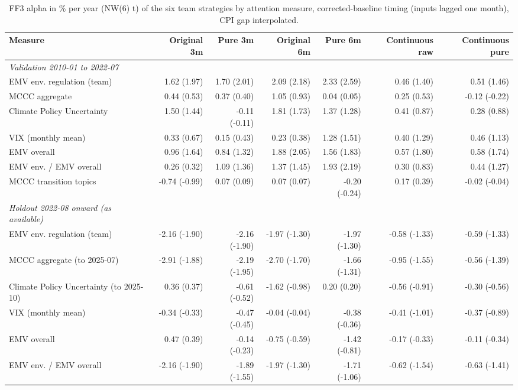 \begin{table}[htbp]
\centering
\footnotesize
\caption{FF3 alpha in \% per year (NW(6) t) of the six team strategies by attention measure, corrected-baseline timing (inputs lagged one month), CPI gap interpolated.}
\label{tab:m1b_alpha_grid_realtime}
\begin{tabular}{lrrrrrr}
\toprule
Measure & Original 3m & Pure 3m & Original 6m & Pure 6m & Continuous raw & Continuous pure \\
\midrule
\textit{Validation 2010-01 to 2022-07} &  &  &  &  &  &  \\
EMV env. regulation (team) & 1.62 (1.97) & 1.70 (2.01) & 2.09 (2.18) & 2.33 (2.59) & 0.46 (1.40) & 0.51 (1.46) \\
MCCC aggregate & 0.44 (0.53) & 0.37 (0.40) & 1.05 (0.93) & 0.04 (0.05) & 0.25 (0.53) & -0.12 (-0.22) \\
Climate Policy Uncertainty & 1.50 (1.44) & -0.11 (-0.11) & 1.81 (1.73) & 1.37 (1.28) & 0.41 (0.87) & 0.28 (0.88) \\
VIX (monthly mean) & 0.33 (0.67) & 0.15 (0.43) & 0.23 (0.38) & 1.28 (1.51) & 0.40 (1.29) & 0.46 (1.13) \\
EMV overall & 0.96 (1.64) & 0.84 (1.32) & 1.88 (2.05) & 1.56 (1.83) & 0.57 (1.80) & 0.58 (1.74) \\
EMV env. / EMV overall & 0.26 (0.32) & 1.09 (1.36) & 1.37 (1.45) & 1.93 (2.19) & 0.30 (0.83) & 0.44 (1.27) \\
MCCC transition topics & -0.74 (-0.99) & 0.07 (0.09) & 0.07 (0.07) & -0.20 (-0.24) & 0.17 (0.39) & -0.02 (-0.04) \\
\textit{Holdout 2022-08 onward (as available)} &  &  &  &  &  &  \\
EMV env. regulation (team) & -2.16 (-1.90) & -2.16 (-1.90) & -1.97 (-1.30) & -1.97 (-1.30) & -0.58 (-1.33) & -0.59 (-1.33) \\
MCCC aggregate (to 2025-07) & -2.91 (-1.88) & -2.19 (-1.95) & -2.70 (-1.70) & -1.66 (-1.31) & -0.95 (-1.55) & -0.56 (-1.39) \\
Climate Policy Uncertainty (to 2025-10) & 0.36 (0.37) & -0.61 (-0.52) & -1.62 (-0.98) & 0.20 (0.20) & -0.56 (-0.91) & -0.30 (-0.56) \\
VIX (monthly mean) & -0.34 (-0.33) & -0.47 (-0.45) & -0.04 (-0.04) & -0.38 (-0.36) & -0.41 (-1.01) & -0.37 (-0.89) \\
EMV overall & 0.47 (0.39) & -0.14 (-0.23) & -0.75 (-0.59) & -1.42 (-0.81) & -0.17 (-0.33) & -0.11 (-0.34) \\
EMV env. / EMV overall & -2.16 (-1.90) & -1.89 (-1.55) & -1.97 (-1.30) & -1.71 (-1.06) & -0.62 (-1.54) & -0.63 (-1.41) \\

\end{tabular}
\end{table}
